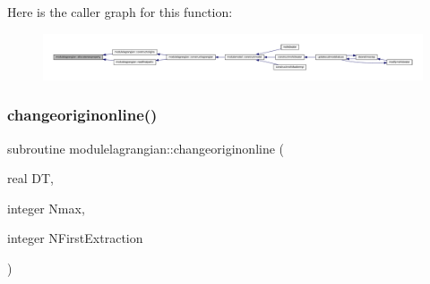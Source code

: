 Here is the caller graph for this function\+:\nopagebreak
\begin{figure}[H]
\begin{center}
\leavevmode
\includegraphics[width=350pt]{namespacemodulelagrangian_a85933ed7a699fa0b842b3a0c17c94bbb_icgraph}
\end{center}
\end{figure}
\mbox{\label{namespacemodulelagrangian_abfb29437c427b37d5253837c1d2b738e}} 
\subsubsection{\texorpdfstring{changeoriginonline()}{changeoriginonline()}}
{\footnotesize\ttfamily subroutine modulelagrangian\+::changeoriginonline (\begin{DoxyParamCaption}\item[{real}]{DT,  }\item[{integer}]{Nmax,  }\item[{integer}]{N\+First\+Extraction }\end{DoxyParamCaption})\hspace{0.3cm}{\ttfamily [private]}}


